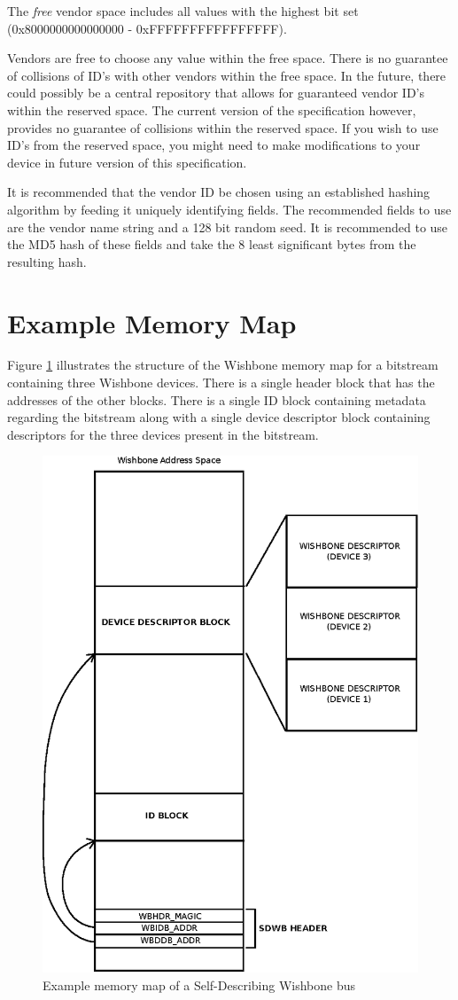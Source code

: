 \documentclass{article}
\begin{document}
The \emph{free} vendor space includes all values with the highest 
bit set (0x8000000000000000 - 0xFFFFFFFFFFFFFFFF).

Vendors are free to choose any value within the free space. There is no
guarantee of collisions of ID's with other vendors within the free space.
In the future, there could possibly be a central repository that allows
for guaranteed vendor ID's within the reserved space. The current version
of the specification however, provides no guarantee of collisions within
the reserved space. If you wish to use ID's from the reserved space, you
might need to make modifications to your device in future version of this
specification.

It is recommended that the vendor ID be chosen using an established 
hashing algorithm by feeding it uniquely identifying fields. The
recommended fields to use are the vendor name string and a 128 bit random
seed. It is recommended to use the MD5 hash of these fields and take the
8 least significant bytes from the resulting hash.


\section{Example Memory Map}

Figure \ref{fig:wbmap} illustrates the
structure of the Wishbone memory map for a bitstream containing three Wishbone
devices. There is a single header block that has the addresses of the other
blocks. There is a single ID block containing metadata regarding the bitstream
along with a single device descriptor block containing descriptors for the three
devices present in the bitstream.

\begin{figure}[!ht]
	\centering
	\includegraphics{wbmap.eps}
	\caption{Example memory map of a Self-Describing Wishbone bus}
	\label{fig:wbmap}
\end{figure}
\end{document}
